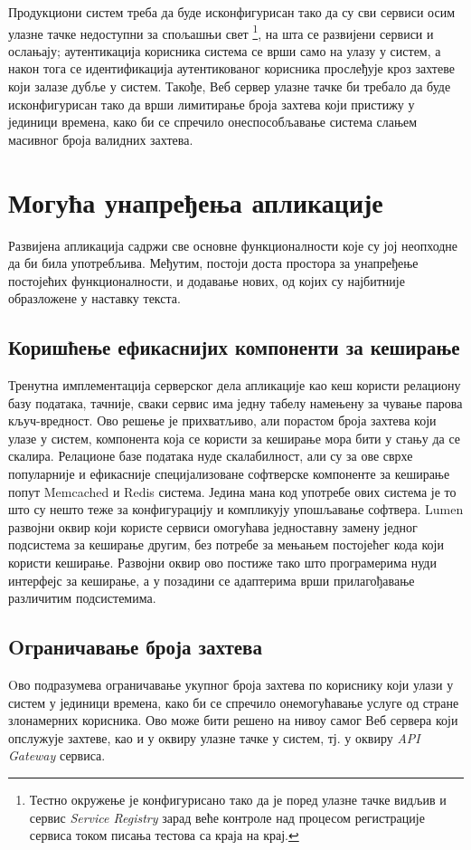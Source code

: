 \documentclass[12pt,oneside]{memoir}
\begin{document}
Продукциони систем треба да буде исконфигурисан тако да су сви сервиси осим улазне тачке недоступни за спољашњи свет \footnote{Тестно окружење је конфигурисано тако да је поред улазне тачке видљив и сервис \textit{Service Registry} зарад веће контроле над процесом регистрације сервиса током писања тестова са краја на крај.}, на шта се развијени сервиси и ослањају; аутентикација корисника система се врши само на улазу у систем, а након тога се идентификација аутентикованог корисника прослеђује кроз захтеве који залазе дубље у систем. Такође, Веб сервер улазне тачке би требало да буде исконфигурисан тако да врши лимитирање броја захтева који пристижу у јединици времена, како би се спречило онеспособљавање система слањем масивног броја валидних захтева.

\section{Могућа унапређења апликације}
Развијена апликација садржи све основне функционалности које су јој неопходне да би била употребљива. Међутим, постоји доста простора за унапређење постојећих функционалности, и додавање нових, од којих су најбитније образложене у наставку текста.

\subsection{Коришћење ефикаснијих компоненти за кеширање}
Тренутна имплементација серверског дела апликације као кеш користи релациону базу података, тачније, сваки сервис има једну табелу намењену за чување парова кључ-вредност. Ово решење је прихватљиво, али порастом броја захтева који улазе у систем, компонента која се користи за кеширање мора бити у стању да се скалира. Релационе базе података нуде скалабилност, али су за ове сврхе популарније и ефикасније специјализоване софтверске компоненте за кеширање попут Memcached \cite{memcached} и Redis \cite{redis} система. Једина мана код употребе ових система је то што су нешто теже за конфигурацију и компликују упошљавање софтвера. Lumen развојни оквир који користе сервиси омогућава једноставну замену једног подсистема за кеширање другим, без потребе за мењањем постојећег кода који користи кеширање. Развојни оквир ово постиже тако што програмерима нуди интерфејс за кеширање, а у позадини се адаптерима врши прилагођавање различитим подсистемима.

\subsection{Oграничавање броја захтева}
Oво подразумева ограничавање укупног броја захтева по кориснику који улази у систем у јединици времена, како би се спречило онемогућавање услуге од стране злонамерних корисника. Ово може бити решено на нивоу самог Веб сервера који опслужује захтеве, као и у оквиру улазне тачке у систем, тј. у оквиру \textit{API Gateway} сервиса.
\end{document}
